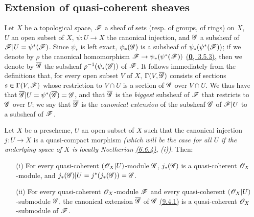 \subsection{Extension of quasi-coherent sheaves}
\label{subsection-extension-of-qcoh}

\begin{env}[9.4.1]
\label{env-1.9.4.1}
Let
$X$ be a topological space, $\mathscr{F}$ a sheaf of sets (resp. of groups, of rings) on $X$, $U$
an open subset of $X$, $\psi:U\to X$ the canonical injection, and $\mathscr{G}$ a subsheaf of
$\mathscr{F}|U=\psi^*(\mathscr{F})$. Since $\psi_*$ is left exact, $\psi_*(\mathscr{G})$ is a subsheaf of
$\psi_*(\psi^*(\mathscr{F}))$; if we denote by $\rho$ the canonical homomorphism
$\mathscr{F}\to\psi_*(\psi^*(\mathscr{F}))$ \hyperref[env-0.3.5.3]{(\textbf{0},~3.5.3)}, then we denote by $\overline{\mathscr{G}}$
the subsheaf $\rho^{-1}(\psi_*(\mathscr{G}))$ of $\mathscr{F}$. It follows immediately from the
definitions that, for every open subset $V$ of $X$, $\Gamma(V,\overline{\mathscr{G}})$ consists of
sections $s\in\Gamma(V,\mathscr{F})$ whose restriction to $V\cap U$ is a section of $\mathscr{G}$ over
$V\cap U$. We thus have that $\overline{\mathscr{G}}|U=\psi^*(\overline{\mathscr{G}})=\mathscr{G}$, and that
$\overline{\mathscr{G}}$ is the {\it biggest} subsheaf of $\mathscr{F}$ that restricts to $\mathscr{G}$
over $U$; we say that $\overline{\mathscr{G}}$ is the {\it canonical extension} of the subsheaf
$\mathscr{G}$ of $\mathscr{F}|U$ to a subsheaf of $\mathscr{F}$.
\end{env}

\begin{prop}[9.4.2]
\label{prop-1.9.4.2}
Let $X$ be a prescheme, $U$ an open subset of $X$ such that the canonical injection
$j:U\to X$ is a quasi-compact morphism {\it (which will be the case for {\it all} $U$ if
the underlying space of $X$ is {\it locally Noetherian}
\hyperref[env-1.6.6.4]{(6.6.4)}, (i))}. Then:
\begin{itemize}
  \item[{\rm(i)}] For every quasi-coherent $(\mathscr{O}_X|U)$-module $\mathscr{G}$, $j_*(\mathscr{G})$
        is a quasi-coherent $\mathscr{O}_X$-module, and $j_*(\mathscr{G})|U=j^*(j_*(\mathscr{G}))=\mathscr{G}$.
  \item[{\rm(ii)}] For every quasi-coherent $\mathscr{O}_X$-module $\mathscr{F}$ and every quasi-coherent
        $(\mathscr{O}_X|U)$-submodule $\mathscr{G}$, the canonical extension
        $\overline{\mathscr{G}}$ of $\mathscr{G}$ \hyperref[env-1.9.4.1]{(9.4.1)} is a
        quasi-coherent $\mathscr{O}_X$-submodule of $\mathscr{F}$.
\end{itemize}
\end{prop}

